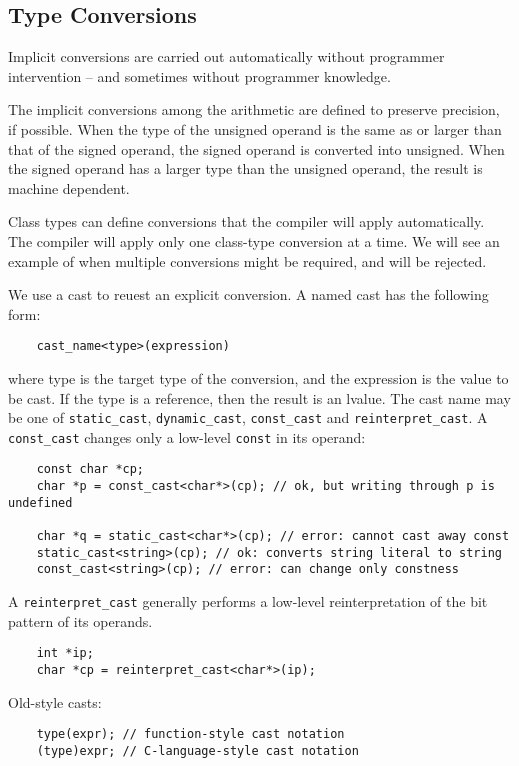 \documentclass[11pt]{ctexart}
\begin{document}
\subsection{Type Conversions}
Implicit conversions are carried out automatically without programmer intervention -- and sometimes without programmer knowledge.\par The implicit conversions among the arithmetic are defined to preserve precision, if possible. When the type of the unsigned operand is the same as or larger than that of the signed operand, the signed operand is converted into unsigned. When the signed operand has a larger type than the unsigned operand, the result is machine dependent.\par Class types can define conversions that the compiler will apply automatically. The compiler will apply only one class-type conversion at a time. We will see an example of when multiple conversions might be required, and will be rejected.\par We use a cast to reuest an explicit conversion. A named cast has the following form:
\begin{lstlisting}
    cast_name<type>(expression)
\end{lstlisting}
where type is the target type of the conversion, and the expression is the value to be cast. If the type is a reference, then the result is an lvalue. The cast name may be one of \verb|static_cast|, \verb|dynamic_cast|, \verb|const_cast| and \verb|reinterpret_cast|. A \verb|const_cast| changes only a low-level \verb|const| in its operand: 
\begin{lstlisting}
    const char *cp;
    char *p = const_cast<char*>(cp); // ok, but writing through p is undefined

    char *q = static_cast<char*>(cp); // error: cannot cast away const
    static_cast<string>(cp); // ok: converts string literal to string
    const_cast<string>(cp); // error: can change only constness
\end{lstlisting}
\par A \verb|reinterpret_cast| generally performs a low-level reinterpretation of the bit pattern of its operands.
\begin{lstlisting}
    int *ip;
    char *cp = reinterpret_cast<char*>(ip);
\end{lstlisting}
Old-style casts:
\begin{lstlisting}
    type(expr); // function-style cast notation
    (type)expr; // C-language-style cast notation
\end{lstlisting}
\end{document}
